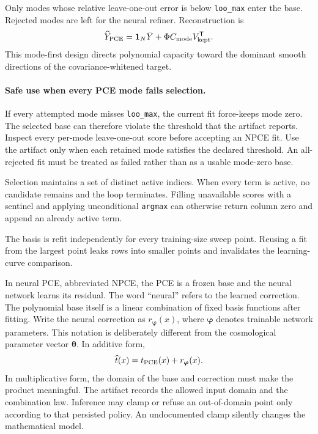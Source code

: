 \documentclass[10pt,aps,prd,twocolumn,nofootinbib]{revtex4-2}
\newcommand{\code}[1]{\texttt{#1}}
\newcommand{\btheta}{\boldsymbol{\theta}}
\begin{document}
Only modes whose relative leave-one-out error is below \code{loo\_max} enter
the base.  Rejected modes are left for the neural refiner.  Reconstruction is
\begin{equation*}
 \widehat Y_{\rm PCE}
 =\mathbf 1_N\bar Y+\Phi C_{\rm mode}V_{\rm kept}^{\mathsf T}.
\end{equation*}
This mode-first design directs polynomial capacity toward the dominant smooth
directions of the covariance-whitened target.

\paragraph{Safe use when every PCE mode fails selection.}
If every attempted mode misses \code{loo\_max}, the current fit force-keeps
mode zero.  The selected base can therefore violate the threshold that the
artifact reports.  Inspect every per-mode leave-one-out score before accepting
an NPCE fit.  Use the artifact only when each retained mode satisfies the
declared threshold.  An all-rejected fit must be treated as failed rather than
as a usable mode-zero base.

Selection maintains a set of distinct active indices.  When every term is
active, no candidate remains and the loop terminates.  Filling unavailable
scores with a sentinel and applying unconditional \code{argmax} can otherwise
return column zero and append an already active term.

The basis is refit independently for every training-size sweep point.  Reusing
a fit from the largest point leaks rows into smaller points and invalidates
the learning-curve comparison.

In neural PCE, abbreviated NPCE, the PCE is a frozen base and the neural
network learns its residual.  The word
``neural'' refers to the learned correction.  The polynomial base itself is a
linear combination of fixed basis functions after fitting.  Write the neural
correction as \(r_{\boldsymbol\varphi}(x)\), where
\(\boldsymbol\varphi\) denotes trainable network parameters.  This notation is
deliberately different from the cosmological parameter vector
\(\btheta\).  In additive form,
\begin{equation*}
  \widehat t(x)=t_{\rm PCE}(x)+r_{\boldsymbol\varphi}(x).
\end{equation*}
In multiplicative form, the domain of the base and correction must make the
product meaningful.  The artifact records the allowed input domain and the
combination law.  Inference may clamp or refuse an out-of-domain point only
according to that persisted policy.  An undocumented clamp silently changes
the mathematical model.
\end{document}
